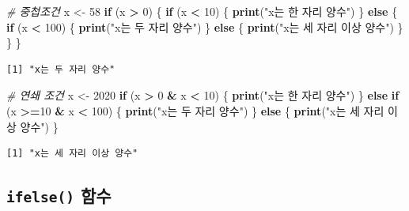 \documentclass[
  11pt,
]{krantz}
\newenvironment{Shaded}{\begin{snugshade}}{\end{snugshade}}
\newcommand{\CommentTok}[1]{\textcolor[rgb]{0.37,0.37,0.37}{\textit{#1}}}
\newcommand{\ControlFlowTok}[1]{\textcolor[rgb]{0.27,0.27,0.27}{\textbf{#1}}}
\newcommand{\DecValTok}[1]{\textcolor[rgb]{0.06,0.06,0.06}{#1}}
\newcommand{\KeywordTok}[1]{\textcolor[rgb]{0.27,0.27,0.27}{\textbf{#1}}}
\newcommand{\NormalTok}[1]{#1}
\newcommand{\OperatorTok}[1]{\textcolor[rgb]{0.43,0.43,0.43}{\textbf{#1}}}
\newcommand{\StringTok}[1]{\textcolor[rgb]{0.5,0.5,0.5}{#1}}
\begin{document}
\normalsize

\footnotesize

\begin{Shaded}
\begin{Highlighting}[]
\CommentTok{# 중첩조건}
\NormalTok{x <-}\StringTok{ }\DecValTok{58}
\ControlFlowTok{if}\NormalTok{ (x }\OperatorTok{>}\StringTok{ }\DecValTok{0}\NormalTok{) \{}
  \ControlFlowTok{if}\NormalTok{ (x }\OperatorTok{<}\StringTok{ }\DecValTok{10}\NormalTok{) \{}
    \KeywordTok{print}\NormalTok{(}\StringTok{"x는 한 자리 양수"}\NormalTok{)}
\NormalTok{  \} }\ControlFlowTok{else}\NormalTok{ \{}
    \ControlFlowTok{if}\NormalTok{ (x }\OperatorTok{<}\StringTok{ }\DecValTok{100}\NormalTok{) \{  }
      \KeywordTok{print}\NormalTok{(}\StringTok{"x는 두 자리 양수"}\NormalTok{)}
\NormalTok{    \} }\ControlFlowTok{else}\NormalTok{ \{}
      \KeywordTok{print}\NormalTok{(}\StringTok{"x는 세 자리 이상 양수"}\NormalTok{)}
\NormalTok{    \}}
\NormalTok{  \}}
\NormalTok{\}}
\end{Highlighting}
\end{Shaded}

\begin{verbatim}
[1] "x는 두 자리 양수"
\end{verbatim}

\begin{Shaded}
\begin{Highlighting}[]
\CommentTok{# 연쇄 조건}
\NormalTok{x <-}\StringTok{ }\DecValTok{2020}
\ControlFlowTok{if}\NormalTok{ (x }\OperatorTok{>}\StringTok{ }\DecValTok{0} \OperatorTok{&}\StringTok{ }\NormalTok{x }\OperatorTok{<}\StringTok{ }\DecValTok{10}\NormalTok{) \{}
  \KeywordTok{print}\NormalTok{(}\StringTok{"x는 한 자리 양수"}\NormalTok{)}
\NormalTok{\} }\ControlFlowTok{else} \ControlFlowTok{if}\NormalTok{ (x }\OperatorTok{>=}\DecValTok{10} \OperatorTok{&}\StringTok{ }\NormalTok{x }\OperatorTok{<}\StringTok{ }\DecValTok{100}\NormalTok{) \{}
  \KeywordTok{print}\NormalTok{(}\StringTok{"x는 두 자리 양수"}\NormalTok{)}
\NormalTok{\} }\ControlFlowTok{else}\NormalTok{ \{}
  \KeywordTok{print}\NormalTok{(}\StringTok{"x는 세 자리 이상 양수"}\NormalTok{)}
\NormalTok{\}}
\end{Highlighting}
\end{Shaded}

\begin{verbatim}
[1] "x는 세 자리 이상 양수"
\end{verbatim}

\normalsize

\hypertarget{ifelse-fun}{%
\subsection{\texorpdfstring{\textbf{\texttt{ifelse()} 함수}}{ifelse() 함수}}\label{ifelse-fun}}
\end{document}
